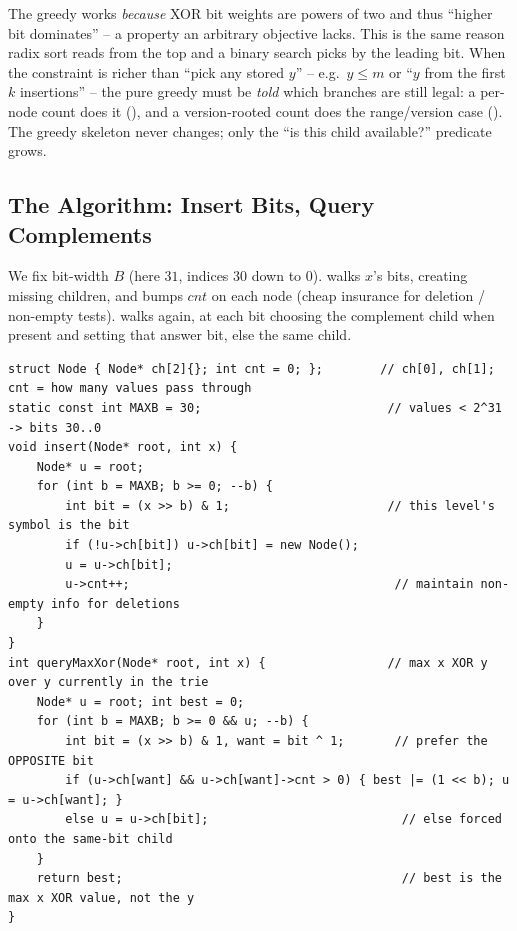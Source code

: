 \begin{insightbox}
The greedy works \emph{because} XOR bit weights are powers of two and thus ``higher bit dominates'' --
a property an arbitrary objective lacks. This is the same reason radix sort reads from the top and a
binary search picks by the leading bit. When the constraint is richer than ``pick any stored $y$'' -- e.g.\
$y \le m$ or ``$y$ from the first $k$ insertions'' -- the pure greedy must be \emph{told} which branches
are still legal: a per-node count does it (\probref{c08-summit}), and a version-rooted count does the
range/version case (\secref{c08-variants}). The greedy skeleton never changes; only the ``is this child
available?'' predicate grows.
\end{insightbox}

\subsection{The Algorithm: Insert Bits, Query Complements}

We fix bit-width $B$ (here $31$, indices $30$ down to $0$).  walks $x$'s bits, creating
missing children, and bumps $\mathit{cnt}$ on each node (cheap insurance for deletion / non-empty tests).
\code{queryMaxXor(x)} walks again, at each bit choosing the complement child when present and setting that
answer bit, else the same child.

\begin{lstlisting}[caption={Binary trie for max XOR: \code{insert} sets bits MSB-first, \code{queryMaxXor} prefers the complement}, label={lst:c08-maxxor}]
struct Node { Node* ch[2]{}; int cnt = 0; };        // ch[0], ch[1]; cnt = how many values pass through
static const int MAXB = 30;                          // values < 2^31 -> bits 30..0
void insert(Node* root, int x) {
    Node* u = root;
    for (int b = MAXB; b >= 0; --b) {
        int bit = (x >> b) & 1;                      // this level's symbol is the bit
        if (!u->ch[bit]) u->ch[bit] = new Node();
        u = u->ch[bit];
        u->cnt++;                                     // maintain non-empty info for deletions
    }
}
int queryMaxXor(Node* root, int x) {                 // max x XOR y over y currently in the trie
    Node* u = root; int best = 0;
    for (int b = MAXB; b >= 0 && u; --b) {
        int bit = (x >> b) & 1, want = bit ^ 1;       // prefer the OPPOSITE bit
        if (u->ch[want] && u->ch[want]->cnt > 0) { best |= (1 << b); u = u->ch[want]; }
        else u = u->ch[bit];                           // else forced onto the same-bit child
    }
    return best;                                       // best is the max x XOR value, not the y
}
\end{lstlisting}

